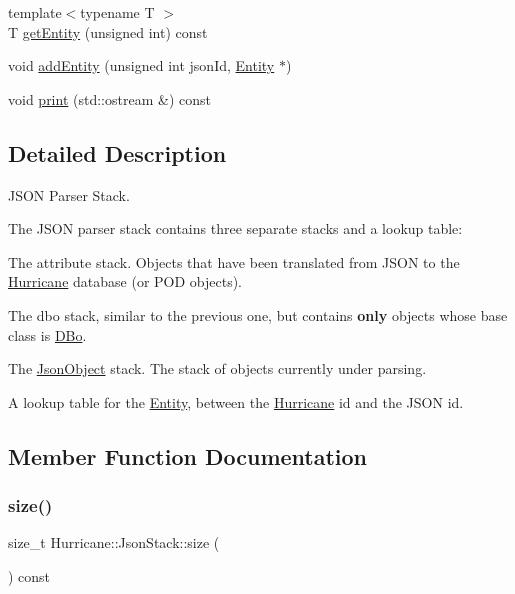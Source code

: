 \begin{DoxyCompactItemize}
\item 
{\footnotesize template$<$typename T $>$ }\\T \mbox{\hyperlink{classHurricane_1_1JsonStack_aadbd70d7d19d2eb0a6c9c86ca1583c76}{get\+Entity}} (unsigned int) const
\item 
void \mbox{\hyperlink{classHurricane_1_1JsonStack_a421fdf4a3bab01d75f0aab292cc574d0}{add\+Entity}} (unsigned int json\+Id, \mbox{\hyperlink{classHurricane_1_1Entity}{Entity}} $\ast$)
\item 
void \mbox{\hyperlink{classHurricane_1_1JsonStack_a7e0364c8868b8396db10399a855b8aa1}{print}} (std\+::ostream \&) const
\end{DoxyCompactItemize}


\subsection{Detailed Description}
J\+S\+ON Parser Stack. 

The J\+S\+ON parser stack contains three separate stacks and a lookup table\+:
\begin{DoxyEnumerate}
\item The {\ttfamily attribute} stack. Objects that have been translated from J\+S\+ON to the \mbox{\hyperlink{namespaceHurricane}{Hurricane}} database (or P\+OD objects).
\item The {\ttfamily dbo} stack, similar to the previous one, but contains {\bfseries only} objects whose base class is \mbox{\hyperlink{classHurricane_1_1DBo}{D\+Bo}}.
\item The \mbox{\hyperlink{classHurricane_1_1JsonObject}{Json\+Object}} stack. The stack of objects currently under parsing.
\item A lookup table for the \mbox{\hyperlink{classHurricane_1_1Entity}{Entity}}, between the \mbox{\hyperlink{namespaceHurricane}{Hurricane}} {\ttfamily id} and the J\+S\+ON {\ttfamily id}. 
\end{DoxyEnumerate}

\subsection{Member Function Documentation}
\mbox{\label{classHurricane_1_1JsonStack_a80b1e4cab1a3c4cac83491d18c76534d}} 
\subsubsection{\texorpdfstring{size()}{size()}}
{\footnotesize\ttfamily size\+\_\+t Hurricane\+::\+Json\+Stack\+::size (\begin{DoxyParamCaption}{ }\end{DoxyParamCaption}) const\hspace{0.3cm}{\ttfamily [inline]}}

